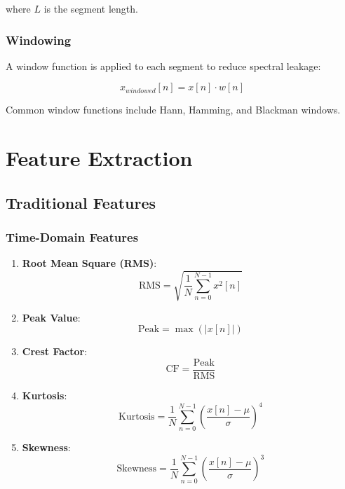 where $L$ is the segment length.

\subsubsection{Windowing}

A window function is applied to each segment to reduce spectral leakage:

\begin{equation}
x_{windowed}[n] = x[n] \cdot w[n]
\end{equation}

Common window functions include Hann, Hamming, and Blackman windows.

\section{Feature Extraction}

\subsection{Traditional Features}

\subsubsection{Time-Domain Features}

\begin{enumerate}
    \item \textbf{Root Mean Square (RMS)}:
    \begin{equation}
    \text{RMS} = \sqrt{\frac{1}{N} \sum_{n=0}^{N-1} x^2[n]}
    \end{equation}
    
    \item \textbf{Peak Value}:
    \begin{equation}
    \text{Peak} = \max(|x[n]|)
    \end{equation}
    
    \item \textbf{Crest Factor}:
    \begin{equation}
    \text{CF} = \frac{\text{Peak}}{\text{RMS}}
    \end{equation}
    
    \item \textbf{Kurtosis}:
    \begin{equation}
    \text{Kurtosis} = \frac{1}{N} \sum_{n=0}^{N-1} \left(\frac{x[n] - \mu}{\sigma}\right)^4
    \end{equation}
    
    \item \textbf{Skewness}:
    \begin{equation}
    \text{Skewness} = \frac{1}{N} \sum_{n=0}^{N-1} \left(\frac{x[n] - \mu}{\sigma}\right)^3
    \end{equation}
\end{enumerate}

